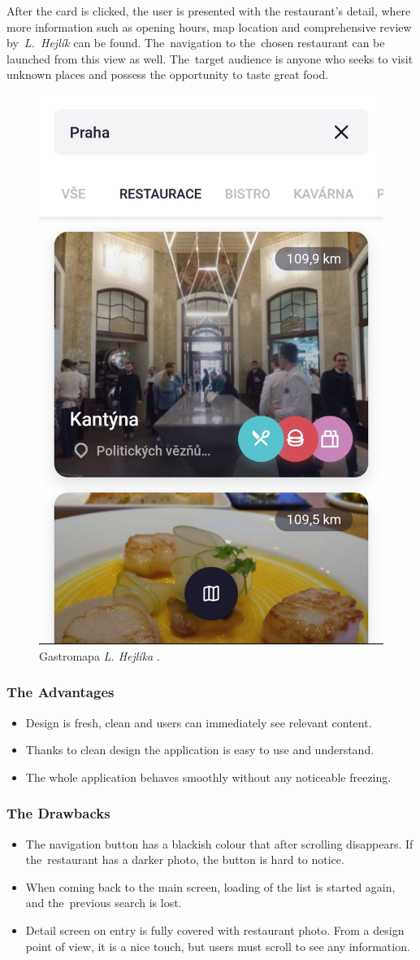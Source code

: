 After the card is clicked, the user is presented with the restaurant's detail, where more information such as opening hours, map location and comprehensive review by~\textit{L.~Hejlík} can be found. The~navigation to the~chosen restaurant can be launched from this view as well. The~target audience is anyone who seeks to visit unknown places and possess the opportunity to taste great food.

\begin{figure}[ht]
    \centering
    \includegraphics[width=0.33\linewidth]{img/analysis/app-hejlik.jpg}
    \caption{Gastromapa \textit{L. Hejlíka} \cite{app-hejlik}.}
    \label{fig:gastromapa-hejlik}
\end{figure}

\subsubsection{The Advantages}
\begin{itemize}
    \item Design is fresh, clean and users can immediately see relevant content.
    \item Thanks to clean design the application is easy to use and understand.
    \item The whole application behaves smoothly without any noticeable freezing.
\end{itemize}

\subsubsection{The Drawbacks}
\begin{itemize}
    \item The navigation button has a blackish colour that after scrolling disappears. If the~restaurant has a darker photo, the button is hard to notice. 
    \item When coming back to the main screen, loading of the list is started again, and the~previous search is lost.
    \item Detail screen on entry is fully covered with restaurant photo. From a design point of view, it is a nice touch, but users must scroll to see any information. 
\end{itemize}

